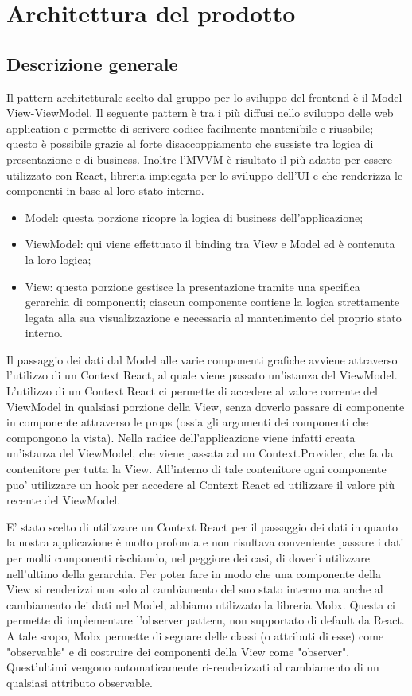 \section{Architettura del prodotto}\label{section:architettura del prodotto}
\subsection{Descrizione generale}
Il pattern architetturale scelto dal gruppo per lo sviluppo del frontend è il Model-View-ViewModel. Il
seguente pattern è tra i più diffusi nello sviluppo delle web application e permette di scrivere codice
facilmente mantenibile e riusabile; questo è possibile grazie al forte disaccoppiamento che sussiste tra
logica di presentazione e di business. Inoltre l'MVVM è risultato il più adatto per essere utilizzato con
React, libreria impiegata per lo sviluppo dell'UI e che renderizza le componenti in base al loro stato
interno.
\begin{itemize}
\item Model: questa porzione ricopre la logica di business dell'applicazione; %
\item ViewModel: qui viene effettuato il binding tra View e Model ed è contenuta la loro logica;
\item View: questa porzione gestisce la presentazione tramite una specifica gerarchia di componenti;
ciascun componente contiene la logica strettamente legata alla sua visualizzazione e necessaria al
mantenimento del proprio stato interno.
\end{itemize}

Il passaggio dei dati dal Model alle varie componenti grafiche avviene attraverso l'utilizzo di un Context
React, al quale viene passato un'istanza del ViewModel. L'utilizzo di un Context React ci permette di
accedere al valore corrente del ViewModel in qualsiasi porzione della View, senza doverlo passare di
componente in componente attraverso le props (ossia gli argomenti dei componenti che compongono la
vista). Nella radice dell'applicazione viene infatti creata un'istanza del ViewModel, che viene passata
ad un Context.Provider, che fa da contenitore per tutta la View. All'interno di tale contenitore ogni
componente puo' utilizzare un hook per accedere al Context React ed utilizzare il valore più recente del ViewModel.

E' stato scelto di utilizzare un Context React per il passaggio dei dati in quanto la nostra applicazione è
molto profonda e non risultava conveniente passare i dati per molti componenti rischiando, nel peggiore
dei casi, di doverli utilizzare nell'ultimo della gerarchia.
Per poter fare in modo che una componente della View si renderizzi non solo al cambiamento del
suo stato interno ma anche al cambiamento dei dati nel Model, abbiamo utilizzato la libreria Mobx.
Questa ci permette di implementare l'observer pattern, non supportato di default da React. A tale
scopo, Mobx permette di segnare delle classi (o attributi di esse) come "observable" e di costruire
dei componenti della View come "observer". Quest'ultimi vengono automaticamente ri-renderizzati al
cambiamento di un qualsiasi attributo observable.

